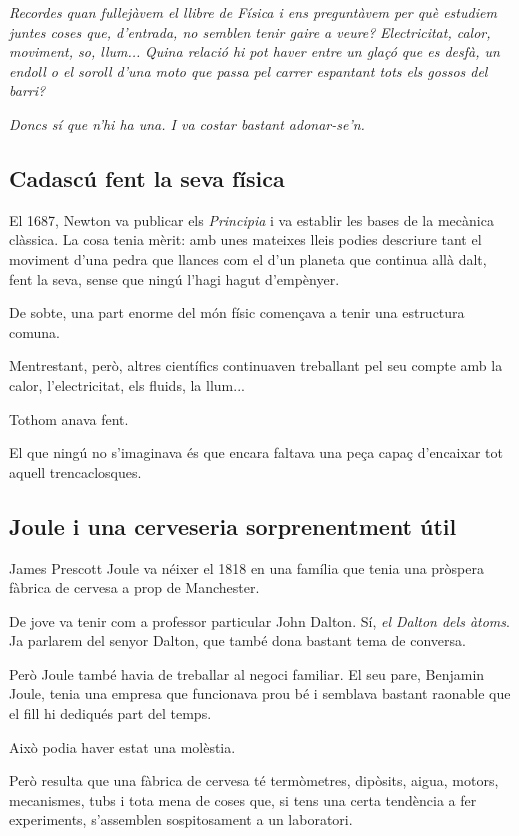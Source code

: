 
\textit{
Recordes quan fullejàvem el llibre de Física i ens preguntàvem per què estudiem juntes coses que, d'entrada, no semblen tenir gaire a veure?
}
\textit{
Electricitat, calor, moviment, so, llum...
}
\textit{
Quina relació hi pot haver entre un glaçó que es desfà, un endoll o el soroll d'una moto que passa pel carrer espantant tots els gossos del barri?
}

\textit{
Doncs sí que n'hi ha una. I va costar bastant adonar-se'n.
}

\subsection{Cadascú fent la seva física}

El 1687, Newton va publicar els \textit{Principia} i va establir les bases de la mecànica clàssica. La cosa tenia mèrit: amb unes mateixes lleis podies descriure tant el moviment d’una pedra que llances com el d’un planeta que continua allà dalt, fent la seva, sense que ningú l’hagi hagut d’empènyer.

De sobte, una part enorme del món físic començava a tenir una estructura comuna.

Mentrestant, però, altres científics continuaven treballant pel seu compte amb la calor, l'electricitat, els fluids, la llum...

Tothom anava fent.

El que ningú no s’imaginava és que encara faltava una peça capaç d’encaixar tot aquell trencaclosques.

\subsection{Joule i una cerveseria sorprenentment útil}

James Prescott Joule va néixer el 1818 en una família que tenia una pròspera fàbrica de cervesa a prop de Manchester.

De jove va tenir com a professor particular John Dalton. Sí, \textit{el Dalton dels àtoms}. Ja parlarem del senyor Dalton, que també dona bastant tema de conversa.

Però Joule també havia de treballar al negoci familiar. El seu pare, Benjamin Joule, tenia una empresa que funcionava prou bé i semblava bastant raonable que el fill hi dediqués part del temps.

Això podia haver estat una molèstia.

Però resulta que una fàbrica de cervesa té termòmetres, dipòsits, aigua, motors, mecanismes, tubs i tota mena de coses que, si tens una certa tendència a fer experiments, s'assemblen sospitosament a un laboratori.


